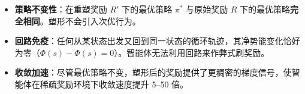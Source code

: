 \begin{keybox}
\begin{itemize}
  \item \textbf{策略不变性}：在重塑奖励 $R'$ 下的最优策略 $\pi^*$ 与原始奖励 $R$ 下的最优策略\textbf{完全相同}。塑形不会引入次优行为。
  \item \textbf{回路免疫}：任何从某状态出发又回到同一状态的循环轨迹，其净势能变化恰好为零（$\Phi(s) - \Phi(s) = 0$）。智能体无法利用回路来作弊式刷奖励。
  \item \textbf{收敛加速}：尽管最优策略不变，塑形后的奖励提供了更稠密的梯度信号，使智能体在稀疏奖励环境下收敛速度提升 5--50 倍。
\end{itemize}
\end{keybox}
